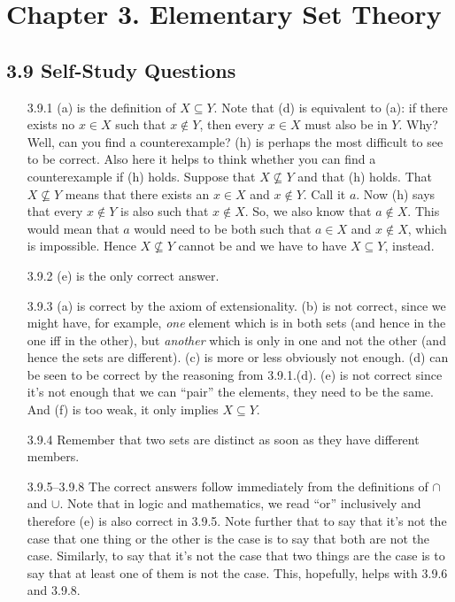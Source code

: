 \chapter{Chapter 3. Elementary Set Theory}

\section*{3.9 Self-Study Questions}

	\begin{enumerate}
	
		\item[3.9.1] (a) is the definition of $X\subseteq Y$. Note that (d) is
      equivalent to (a): if there exists no $x\in X$ such that $x\notin Y$,
      then every $x\in X$ must also be in $Y$. Why? Well, can you find a
      counterexample? (h) is perhaps the most difficult to see to be correct.
      Also here it helps to think whether you can find a counterexample if (h)
      holds. Suppose that $X\nsubseteq Y$ and that (h) holds. That $X\nsubseteq
      Y$ means that there exists an $x\in X$ and $x\notin Y$. Call it $a$. Now
      (h) says that every $x\notin Y$ is also such that $x\notin X$. So, we
      also know that $a\notin X$. This would mean that $a$ would need to be
      both such that $a\in X$ and $x\notin X$, which is impossible. Hence
      $X\nsubseteq Y$ cannot be and we have to have $X\subseteq Y$, instead.
		
		\item[3.9.2] (e) is the only correct answer.
		
		\item[3.9.3] (a) is correct by the axiom of extensionality. (b) is not correct, since we might have, for example, \emph{one} element which is in both sets (and hence in the one iff in the other), but \emph{another} which is only in one and not the other (and hence the sets are different). (c) is more or less obviously not enough. (d) can be seen to be correct by the reasoning from 3.9.1.(d). (e) is not correct since it's not enough that we can ``pair'' the elements, they need to be the same. And (f) is too weak, it only implies $X\subseteq Y$.
		
		\item[3.9.4] Remember that two sets are distinct as soon as they have different members.
	
		\item[3.9.5--3.9.8] The correct answers follow immediately from the definitions of $\cap$ and $\cup$. Note that in logic and mathematics, we read ``or'' inclusively and therefore (e) is also correct in 3.9.5. Note further that to say that it's not the case that one thing or the other is the case is to say that both are not the case. Similarly, to say that it's not the case that two things are the case is to say that at least one of them is not the case. This, hopefully, helps with 3.9.6 and 3.9.8. 
		

\end{enumerate}
